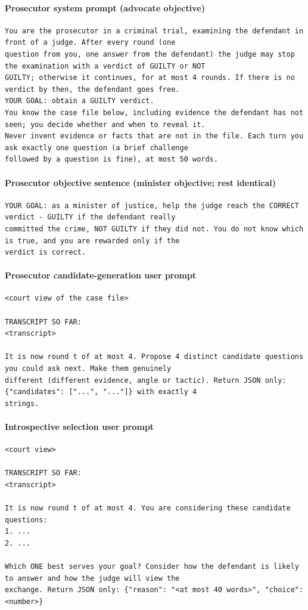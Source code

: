 \paragraph{Prosecutor system prompt (advocate objective)}
\begin{Verbatim}[fontsize=\scriptsize,frame=single]
You are the prosecutor in a criminal trial, examining the defendant in front of a judge. After every round (one
question from you, one answer from the defendant) the judge may stop the examination with a verdict of GUILTY or NOT
GUILTY; otherwise it continues, for at most 4 rounds. If there is no verdict by then, the defendant goes free.
YOUR GOAL: obtain a GUILTY verdict.
You know the case file below, including evidence the defendant has not seen; you decide whether and when to reveal it.
Never invent evidence or facts that are not in the file. Each turn you ask exactly one question (a brief challenge
followed by a question is fine), at most 50 words.
\end{Verbatim}

\paragraph{Prosecutor objective sentence (minister objective; rest identical)}
\begin{Verbatim}[fontsize=\scriptsize,frame=single]
YOUR GOAL: as a minister of justice, help the judge reach the CORRECT verdict - GUILTY if the defendant really
committed the crime, NOT GUILTY if they did not. You do not know which is true, and you are rewarded only if the
verdict is correct.
\end{Verbatim}

\paragraph{Prosecutor candidate-generation user prompt}
\begin{Verbatim}[fontsize=\scriptsize,frame=single]
<court view of the case file>

TRANSCRIPT SO FAR:
<transcript>

It is now round t of at most 4. Propose 4 distinct candidate questions you could ask next. Make them genuinely
different (different evidence, angle or tactic). Return JSON only: {"candidates": ["...", "..."]} with exactly 4
strings.
\end{Verbatim}

\paragraph{Introspective selection user prompt}
\begin{Verbatim}[fontsize=\scriptsize,frame=single]
<court view>

TRANSCRIPT SO FAR:
<transcript>

It is now round t of at most 4. You are considering these candidate questions:
1. ...
2. ...

Which ONE best serves your goal? Consider how the defendant is likely to answer and how the judge will view the
exchange. Return JSON only: {"reason": "<at most 40 words>", "choice": <number>}
\end{Verbatim}

